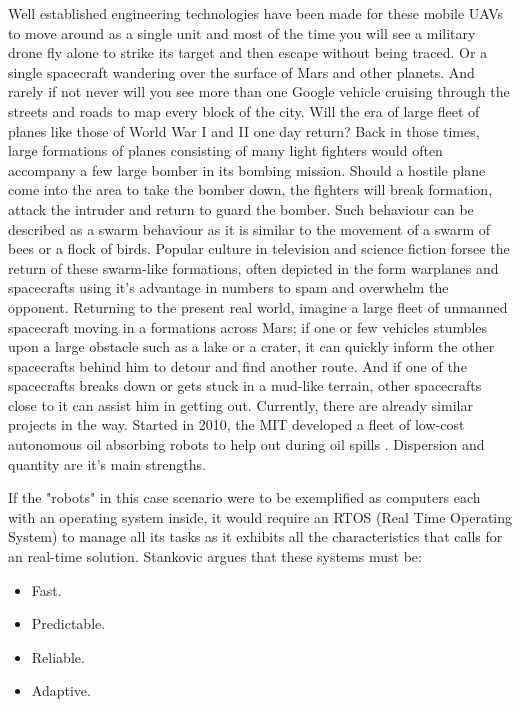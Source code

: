 \documentclass[journal]{IEEEtran}
\begin{document}
Well established engineering technologies have been made for these mobile UAVs to move around as a single unit and most of the time you will see a military drone fly alone to strike its target and then escape without being traced. Or a single spacecraft wandering over the surface of Mars and other planets. And rarely if not never will you see more than one Google vehicle cruising through the streets and roads to map every block of the city. Will the era of large fleet of planes like those of World War I and II one day return? Back in those times, large formations of planes consisting of many light fighters would often accompany a few large bomber in its bombing mission. Should a hostile plane come into the area to take the bomber down, the fighters will break formation, attack the intruder and return to guard the bomber. Such behaviour can be described as a swarm behaviour as it is similar to the movement of a swarm of bees or a flock of birds. Popular culture \cite{YS2} in television and science fiction forsee the return of these swarm-like formations, often depicted in the form warplanes and spacecrafts using it's advantage in numbers to spam and overwhelm the opponent. Returning to the present real world, imagine a large fleet of unmanned spacecraft moving in a formations across Mars; if one or few vehicles stumbles upon a large obstacle such as a lake or a crater, it can quickly inform the other spacecrafts behind him to detour and find another route. And if one of the spacecrafts breaks down or gets stuck in a mud-like terrain, other spacecrafts close to it can assist him in getting out. Currently, there are already similar projects in the way. Started in 2010, the MIT developed a fleet of low-cost autonomous oil absorbing robots to help out during oil spills \cite{YS3.5}\cite{YS3.6}. Dispersion and quantity are it's main strengths. 

If the "robots" in this case scenario were to be exemplified as computers each with an operating system inside, it would require an RTOS (Real Time Operating System) to manage all its tasks as it exhibits all the characteristics that calls for an real-time solution. Stankovic \cite{YS3} argues that these systems must be:

\begin{itemize}
\item Fast.
\item Predictable.
\item Reliable.
\item Adaptive.
\end{itemize}
\end{document}
